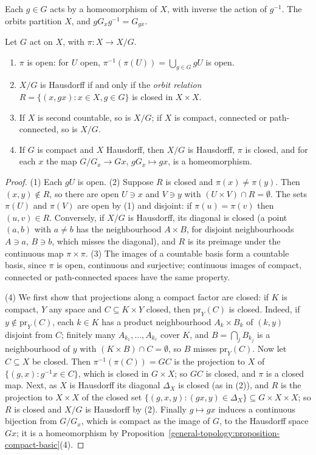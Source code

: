 Each $g \in G$ acts by a homeomorphism of $X$, with inverse the action of $g^{-1}$. The orbits partition $X$, and $gG_xg^{-1} = G_{gx}$.

\begin{proposition}\label{topological-manifolds:proposition-orbit-space}
Let $G$ act on $X$, with $\pi \colon X \to X/G$.
\begin{enumerate}
\item $\pi$ is open: for $U$ open, $\pi^{-1}(\pi(U)) = \bigcup_{g \in G}gU$ is open.
\item $X/G$ is Hausdorff if and only if the \emph{orbit relation} $R = \{(x, gx) : x \in X, g \in G\}$ is closed in $X \times X$.
\item If $X$ is second countable, so is $X/G$; if $X$ is compact, connected or path-connected, so is $X/G$.
\item If $G$ is compact and $X$ Hausdorff, then $X/G$ is Hausdorff, $\pi$ is closed, and for each $x$ the map $G/G_x \to Gx$, $gG_x \mapsto gx$, is a homeomorphism.
\end{enumerate}
\end{proposition}

\begin{proof}
(1) Each $gU$ is open. (2) Suppose $R$ is closed and $\pi(x) \neq \pi(y)$. Then $(x, y) \notin R$, so there are open $U \ni x$ and $V \ni y$ with $(U \times V) \cap R = \emptyset$. The sets $\pi(U)$ and $\pi(V)$ are open by (1) and
disjoint: if $\pi(u) = \pi(v)$ then $(u, v) \in R$. Conversely, if $X/G$ is Hausdorff, its diagonal is closed (a point $(a, b)$ with $a \neq b$ has the neighbourhood $A \times B$, for disjoint neighbourhoods $A \ni a$,
$B \ni b$, which misses the diagonal), and $R$ is its preimage under the continuous map $\pi \times \pi$. (3) The images of a countable basis form a countable basis, since $\pi$ is open, continuous and surjective;
continuous images of compact, connected or path-connected spaces have the same property.

(4) We first show that projections along a compact factor are closed: if $K$ is compact, $Y$ any space and $C \subseteq K \times Y$ closed, then $\mathrm{pr}_Y(C)$ is closed. Indeed, if $y \notin \mathrm{pr}_Y(C)$, each $k \in K$ has
a product neighbourhood $A_k \times B_k$ of $(k, y)$ disjoint from $C$; finitely many $A_{k_1}, \ldots, A_{k_r}$ cover $K$, and $B = \bigcap_jB_{k_j}$ is a neighbourhood of $y$ with $(K \times B) \cap C = \emptyset$, so $B$ misses
$\mathrm{pr}_Y(C)$. Now let $C \subseteq X$ be closed. Then $\pi^{-1}(\pi(C)) = GC$ is the projection to $X$ of $\{(g, x) : g^{-1}x \in C\}$, which is closed in $G \times X$; so $GC$ is closed, and $\pi$ is a closed map. Next, as $X$
is Hausdorff its diagonal $\Delta_X$ is closed (as in (2)), and $R$ is the projection to $X \times X$ of the closed set $\{(g, x, y) : (gx, y) \in \Delta_X\} \subseteq G \times X \times X$; so $R$ is closed and $X/G$ is Hausdorff by (2).
Finally $g \mapsto gx$ induces a continuous bijection from $G/G_x$, which is compact as the image of $G$, to the Hausdorff space $Gx$; it is a homeomorphism by
Proposition~\ref{general-topology:proposition-compact-basic}(4).
\end{proof}

